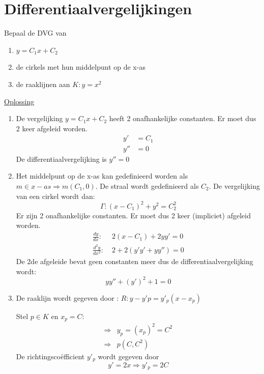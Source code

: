 \documentclass[12pt]{report}
\newcommand{\exercise}[2]{
  #1
  

  \underline{Oplossing}
  
  #2
  
  \hrulefill
}
\begin{document}
\chapter{Differentiaalvergelijkingen}
\exercise{Bepaal de DVG van \begin{enumerate}
                          \item $y = C_1x + C_2$
                          \item de cirkels met hun middelpunt op de x-as 
                          \item de raaklijnen aan $K: y = x^2$
                         \end{enumerate}}
{
\begin{enumerate}
 \item De vergelijking $y = C_1x + C_2$ heeft 2 onafhankelijke constanten. Er moet dus 2 keer afgeleid worden.
 \begin{equation*}
  \begin{split}
   y' & = C_1 \\
   y'' & = 0
  \end{split}
 \end{equation*}
 De differentiaalvergelijking is $y'' = 0$
 \item Het middelpunt op de x-as kan gedefinieerd worden als $m \in x-as \Rightarrow m(C_1, 0)$. De straal wordt gedefinieerd als $C_2$. De vergelijking van een cirkel wordt dan:
 $$\Gamma: (x - C_1)^2 + y^2 = C_2^2$$
 Er zijn 2 onafhankelijke constanten. Er moet dus 2 keer (impliciet) afgeleid worden.
 \begin{equation*}
  \begin{split}
   \frac{dy}{dx} :\; & 2(x - C_1) + 2yy' = 0 \\
   \frac{d^2y}{dx^2} :\; & 2 + 2(y'y' + yy'') = 0
  \end{split}
 \end{equation*}
 De 2de afgeleide bevat geen constanten meer dus de differentiaalvergelijking wordt: 
 $$yy'' + (y')^2 + 1 = 0$$
 \item De raaklijn wordt gegeven door : $R: y - y'p = y'_p(x - x_p)$
 
 Stel $p \in K$ en $x_p = C$:
 \begin{equation*}
  \begin{split}
   \Rightarrow & y_p = (x_p)^2 = C^2 \\
   \Rightarrow & p(C, C^2)
  \end{split}
 \end{equation*}
  De richtingscoëfficient $y'_p$ wordt gegeven door 
  $$y'= 2x \Rightarrow y'_p = 2C$$
  

\end{enumerate}}
\end{document}
